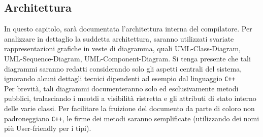 \subsection{Architettura}
In questo capitolo, sarà documentata l'architettura interna del compilatore. Per 
analizzare in dettaglio la suddetta architettura, saranno utilizzati svariate rappresentazioni grafiche 
in veste di diagramma, quali UML-Class-Diagram, UML-Sequence-Diagram, UML-Component-Diagram. Si tenga presente che tali
diagrammi saranno redatti considerando solo gli aspetti centrali del sistema, ignorando alcuni dettagli tecnici
dipendenti ad esempio dal linguaggio \texttt{C++} \\

Per brevità, tali diagrammi documenteranno solo ed esclusivamente metodi pubblici, tralasciando i meotdi
a visibilità ristretta e gli attributi di stato interno delle varie classi. Per facilitare la fruizione del documento
da parte di coloro non padroneggiano \texttt{C++}, le firme dei metodi saranno semplificate (utilizzando dei nomi più 
User-friendly per i tipi).\\

\newpage

 \newpage
 \newpage